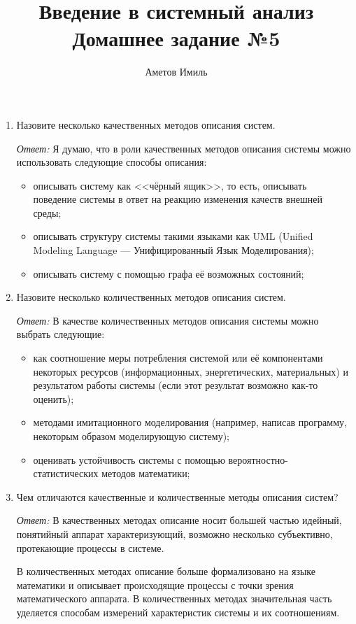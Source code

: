 \documentclass[10pt]{article}
\author{Аметов Имиль}
\title{Введение в системный анализ \\ Домашнее задание №5}
\begin{document}
\maketitle

\begin{enumerate}
\item{Назовите несколько качественных методов описания систем.}

  \emph{Ответ:} Я думаю, что в роли качественных методов описания системы можно использовать следующие способы описания:

  \begin{itemize}
  \item{описывать систему как <<чёрный ящик>>, то есть, описывать поведение системы в ответ на реакцию изменения качеств внешней среды;}
  \item{описывать структуру системы такими языками как UML (Unified Modeling Language --- Унифицированный Язык Моделирования);}
  \item{описывать систему с помощью графа её возможных состояний;}
  \end{itemize}

\item{Назовите несколько количественных методов описания систем.}

  \emph{Ответ:} В качестве количественных методов описания системы можно выбрать следующие:

  \begin{itemize}
  \item{как соотношение меры потребления системой или её компонентами некоторых ресурсов (информационных, энергетических, материальных) и результатом работы системы (если этот результат возможно как-то оценить);}
  \item{методами имитационного моделирования (например, написав программу, некоторым образом моделирующую систему);}
  \item{оценивать устойчивость системы с помощью вероятностно-статистических методов математики;}
  \end{itemize}

\item{Чем отличаются качественные и количественные методы описания систем?}

  \emph{Ответ:} В качественных методах описание носит большей частью идейный, понятийный аппарат характеризующий, возможно несколько субъективно, протекающие процессы в системе.

  В количественных методах описание больше формализовано на языке математики и описывает происходящие процессы с точки зрения математического аппарата. В количественных методах значительная часть уделяется способам измерений характеристик системы и их соотношениям.


\end{enumerate}
\end{document}
